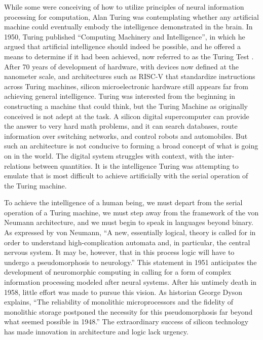 While some were conceiving of how to utilize principles of neural information processing for computation, Alan Turing was contemplating whether any artificial machine could eventually embody the intelligence demonstrated in the brain. In 1950, Turing published ``Computing Machinery and Intelligence'', in which he argued that artificial intelligence should indeed be possible, and he offered a means to determine if it had been achieved, now referred to as the Turing Test \cite{tu1950}. After 70 years of development of hardware, with devices now defined at the nanometer scale, and architectures such as RISC-V that standardize instructions across Turing machines, silicon microelectronic hardware still appears far from achieving general intelligence. Turing was interested from the beginning in constructing a machine that could think, but the Turing Machine as originally conceived is not adept at the task. A silicon digital supercomputer can provide the answer to very hard math problems, and it can search databases, route information over switching networks, and control robots and automobiles. But such an architecture is not conducive to forming a broad concept of what is going on in the world. The digital system struggles with context, with the inter-relations between quantities. It is the intelligence Turing was attempting to emulate that is most difficult to achieve artificially with the serial operation of the Turing machine. 

To achieve the intelligence of a human being, we must depart from the serial operation of a Turing machine, we must step away from the framework of the von Neumann architecture, and we must begin to speak in languages beyond binary. As expressed by von Neumann, ``A new, essentially logical, theory is called for in order to understand high-complication automata and, in particular, the central nervous system. It may be, however, that in this process logic will have to undergo a pseudomorphosis to neurology.'' \cite{ne1951} This statement in 1951 anticipates the development of neuromorphic computing in calling for a form of complex information processing modeled after neural systems. After his untimely death in 1958, little effort was made to pursue this vision. As historian George Dyson explains, ``The reliability of monolithic microprocessors and the fidelity of monolithic storage postponed the necessity for this pseudomorphosis far beyond what seemed possible in 1948.'' \cite{dy2012} The extraordinary success of silicon technology has made innovation in architecture and logic lack urgency.

